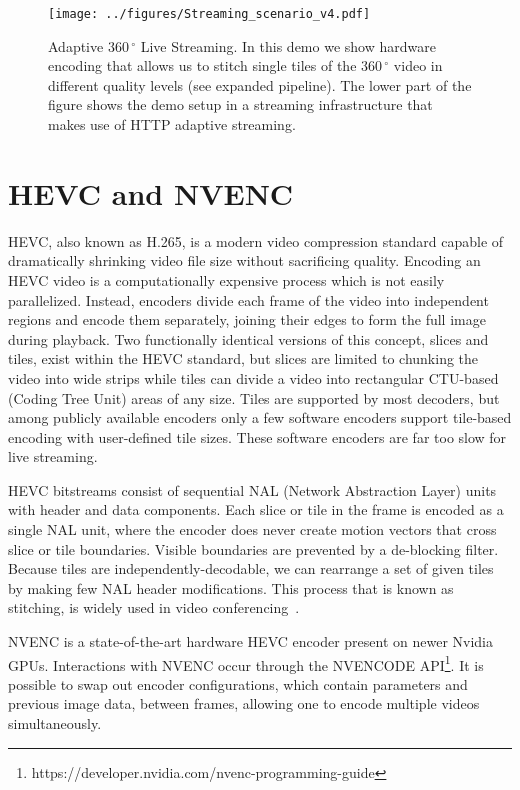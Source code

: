 \renewcommand{\figurename}{Fig.}
\begin{figure*}[t]
	\centering
	\texttt{[image: ../figures/Streaming\_scenario\_v4.pdf]}
	\caption{Adaptive $360\,^{\circ}$ Live Streaming. In this demo we show hardware encoding that allows us to stitch single tiles of the $360\,^{\circ}$ video in different quality levels (see expanded pipeline). The lower part of the figure shows the demo setup in a streaming infrastructure that makes use of HTTP adaptive streaming.}
	\label{fig:pipeline}
\end{figure*}

\vspace{-10pt}
\section{HEVC and NVENC} \label{hevc}

HEVC, also known as H.265, is a modern video compression standard capable of dramatically shrinking video file size without sacrificing quality. Encoding an HEVC video is a computationally expensive process which is not easily parallelized. Instead, encoders divide each frame of the video into independent regions and encode them separately, joining their edges to form the full image during playback. Two functionally identical versions of this concept, slices and tiles, exist within the HEVC standard, but slices are limited to chunking the video into wide strips while tiles can divide a video into rectangular CTU-based (Coding Tree Unit) areas of any size.
Tiles are supported by most decoders, but among publicly available encoders only a few software encoders support tile-based encoding with user-defined tile sizes. These software encoders are far too slow for live streaming.

HEVC bitstreams consist of sequential NAL (Network Abstraction Layer) units with header and data components.
Each slice or tile in the frame is encoded as a single NAL unit, where the encoder does never create motion vectors that cross slice or tile boundaries. Visible boundaries are prevented by a de-blocking filter.
Because tiles are independently-decodable, we can rearrange a set of given tiles by making few NAL header modifications. This process that is known as stitching, is widely used in video conferencing~\cite{amon2012,feldmann2013,delafuente2017}.

NVENC is a state-of-the-art hardware HEVC encoder present on newer Nvidia GPUs. Interactions with NVENC occur through the NVENCODE API\footnote{https://developer.nvidia.com/nvenc-programming-guide}. It is possible to swap out encoder configurations, which contain parameters and previous image data, between frames, allowing one to encode multiple videos simultaneously.

